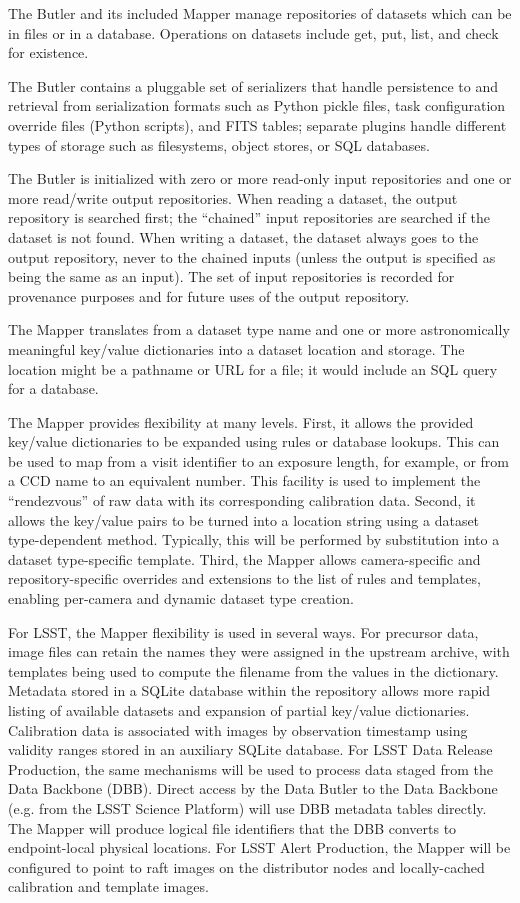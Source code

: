 \documentclass[DM,lsstdraft,toc]{lsstdoc}
\begin{document}
The Butler and its included Mapper manage repositories
of datasets which can be in files or in a database.
Operations on datasets include get, put, list, and check for existence.

The Butler contains a pluggable set of serializers that handle persistence to
and retrieval from serialization formats such as Python pickle files, task
configuration override files (Python scripts), and FITS tables; separate
plugins handle different types of storage such as filesystems, object stores,
or SQL databases.

The Butler is initialized with zero or more read-only input repositories and
one or more read/write output repositories. When reading a dataset, the output
repository is searched first; the ``chained'' input repositories are searched
if the dataset is not found. When writing a dataset, the dataset always goes to
the output repository, never to the chained inputs (unless the output is
specified as being the same as an input).  The set of input repositories is
recorded for provenance purposes and for future uses of the output repository.

The Mapper translates from a dataset type name and one or more
astronomically meaningful key/value dictionaries into a dataset location
and storage. The location might be a pathname or URL for a file; it
would include an SQL query for a database.

The Mapper provides flexibility at many levels. First, it allows the
provided key/value dictionaries to be expanded using rules or database
lookups. This can be used to map from a visit identifier to an exposure
length, for example, or from a CCD name to an equivalent number. This
facility is used to implement the ``rendezvous'' of raw data with its
corresponding calibration data. Second, it allows the key/value pairs to
be turned into a location string using a dataset type-dependent method.
Typically, this will be performed by substitution into a dataset
type-specific template. Third, the Mapper allows camera-specific and
repository-specific overrides and extensions to the list of rules and
templates, enabling per-camera and dynamic dataset type creation.

For LSST, the Mapper flexibility is used in several ways.  For precursor data,
image files can retain the names they were assigned in the upstream archive,
with templates being used to compute the filename from the values in the
dictionary.  Metadata stored in a SQLite database within the repository allows
more rapid listing of available datasets and expansion of partial key/value
dictionaries.  Calibration data is associated with images by observation
timestamp using validity ranges stored in an auxiliary SQLite database.  For
LSST Data Release Production, the same mechanisms will be used to process data
staged from the Data Backbone (DBB).  Direct access by the Data Butler to the
Data Backbone (e.g. from the LSST Science Platform) will use DBB metadata
tables directly.  The Mapper will produce logical file identifiers that the DBB
converts to endpoint-local physical locations.  For LSST Alert Production, the
Mapper will be configured to point to raft images on the distributor nodes and
locally-cached calibration and template images.
\end{document}
